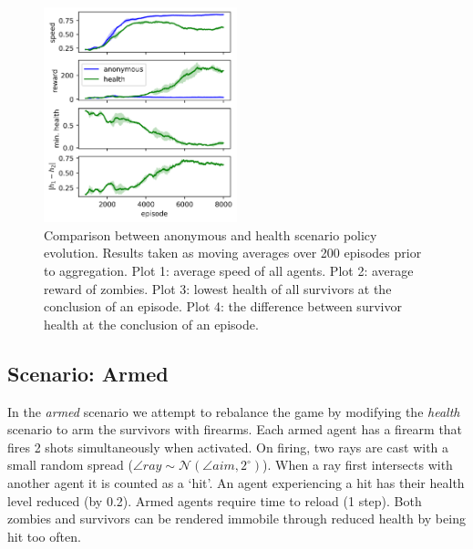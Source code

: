 \documentclass[11pt,a4paper]{article}
\begin{document}

\begin{figure}
  \centering
  \includegraphics[width=0.5\textwidth]{figures/anon_health_compare.png}
  \caption{
    Comparison between anonymous and health scenario policy evolution.
    Results taken as moving averages over 200 episodes prior to aggregation.
    Plot 1: average speed of all agents.
    Plot 2: average reward of zombies.
    Plot 3: lowest health of all survivors at the conclusion of an episode.
    Plot 4: the difference between survivor health at the conclusion of an episode.
  }
  \label{fig:anon_health_compare}
\end{figure}

\subsection{Scenario: Armed}
\label{sec:arms}

In the \emph{armed} scenario we attempt to rebalance the game by modifying the \emph{health} scenario to arm the survivors with firearms.
Each armed agent has a firearm that fires 2 shots simultaneously when activated.
On firing, two rays are cast with a small random spread ($\angle ray \sim \mathcal{N}(\angle aim, 2^\circ)$).
When a ray first intersects with another agent it is counted as a `hit'.
An agent experiencing a hit has their health level reduced (by 0.2).
Armed agents require time to reload (1 step).
Both zombies and survivors can be rendered immobile through reduced health by being hit too often.
\end{document}
